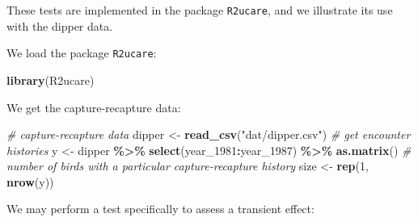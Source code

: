 \documentclass[
  12pt,
]{krantz}
\newenvironment{Shaded}{\begin{snugshade}}{\end{snugshade}}
\newcommand{\CommentTok}[1]{\textcolor[rgb]{0.56,0.35,0.01}{\textit{#1}}}
\newcommand{\DecValTok}[1]{\textcolor[rgb]{0.00,0.00,0.81}{#1}}
\newcommand{\DocumentationTok}[1]{\textcolor[rgb]{0.56,0.35,0.01}{\textbf{\textit{#1}}}}
\newcommand{\FunctionTok}[1]{\textcolor[rgb]{0.13,0.29,0.53}{\textbf{#1}}}
\newcommand{\NormalTok}[1]{#1}
\newcommand{\OtherTok}[1]{\textcolor[rgb]{0.56,0.35,0.01}{#1}}
\newcommand{\SpecialCharTok}[1]{\textcolor[rgb]{0.81,0.36,0.00}{\textbf{#1}}}
\newcommand{\StringTok}[1]{\textcolor[rgb]{0.31,0.60,0.02}{#1}}
\begin{document}
These tests are implemented in the package \texttt{R2ucare}, and we illustrate its use with the dipper data.

We load the package \texttt{R2ucare}:

\begin{Shaded}
\begin{Highlighting}[]
\FunctionTok{library}\NormalTok{(R2ucare)}
\end{Highlighting}
\end{Shaded}

We get the capture-recapture data:

\begin{Shaded}
\begin{Highlighting}[]
\CommentTok{\# capture{-}recapture data}
\NormalTok{dipper }\OtherTok{\textless{}{-}} \FunctionTok{read\_csv}\NormalTok{(}\StringTok{"dat/dipper.csv"}\NormalTok{)}
\CommentTok{\# get encounter histories}
\NormalTok{y }\OtherTok{\textless{}{-}}\NormalTok{ dipper }\SpecialCharTok{\%\textgreater{}\%}
  \FunctionTok{select}\NormalTok{(year\_1981}\SpecialCharTok{:}\NormalTok{year\_1987) }\SpecialCharTok{\%\textgreater{}\%}
  \FunctionTok{as.matrix}\NormalTok{()}
\CommentTok{\# number of birds with a particular capture{-}recapture history}
\NormalTok{size }\OtherTok{\textless{}{-}} \FunctionTok{rep}\NormalTok{(}\DecValTok{1}\NormalTok{, }\FunctionTok{nrow}\NormalTok{(y))}
\end{Highlighting}
\end{Shaded}

We may perform a test specifically to assess a transient effect:

\begin{Shaded}
\end{Shaded}
\end{document}
